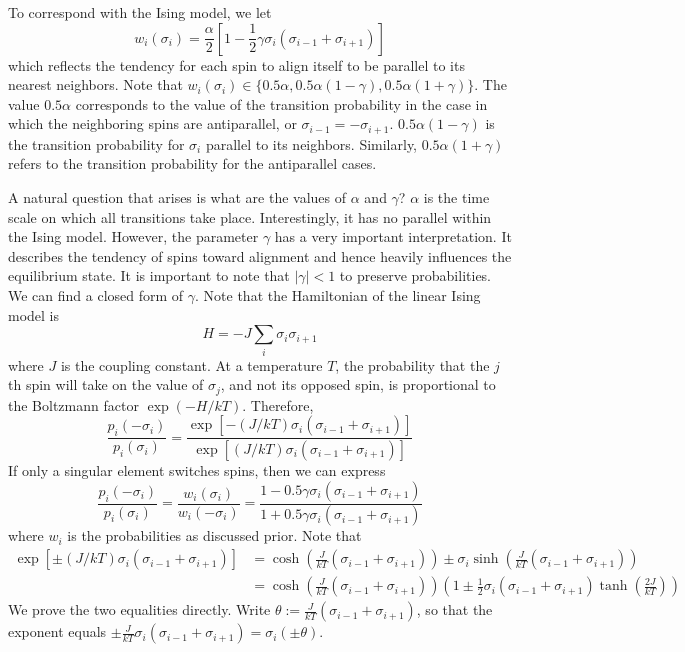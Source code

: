 \documentclass[12pt]{article}
\theoremstyle{definition}
\theoremstyle{remark}
\begin{document}
To correspond with the Ising model, we let 
\[
w_i(\sigma_i) = \frac{\alpha}{2}\left[1 - \frac{1}{2} \gamma \sigma_i (\sigma_{i-1} + \sigma_{i+1}) \right]
\]
which reflects the tendency for each spin to align itself to be parallel to its nearest neighbors. Note that $w_i(\sigma_i) \in \{0.5\alpha, 0.5\alpha(1 - \gamma), 0.5\alpha(1+\gamma)\}$. The value $0.5\alpha$ corresponds to the value of the transition probability in the case in which the neighboring spins are antiparallel, or $\sigma_{i-1} = - \sigma_{i+1}$. $0.5\alpha(1-\gamma)$ is the transition probability for $\sigma_i$ parallel to its neighbors. Similarly, $0.5\alpha(1+\gamma)$ refers to the transition probability for the antiparallel cases.

A natural question that arises is what are the values of $\alpha$ and $\gamma$? $\alpha$ is the time scale on which all transitions take place. Interestingly, it has no parallel within the Ising model. However, the parameter $\gamma$ has a very important interpretation. It describes the tendency of spins toward alignment and hence heavily influences the equilibrium state. It is important to note that $|\gamma| < 1$ to preserve probabilities. We can find a closed form of $\gamma$. Note that the Hamiltonian of the linear Ising model is 
\[
H = -J \sum_i \sigma_i \sigma_{i+1}
\]
where $J$ is the coupling constant. At a temperature $T$, the probability that the $j$th spin will take on the value of $\sigma_j$, and not its opposed spin, is proportional to the Boltzmann factor $\exp(-H/kT)$. Therefore,
\[
\frac{p_i(-\sigma_i)}{p_i(\sigma_i)} = \frac{\exp \left[ -(J/kT)\sigma_i(\sigma_{i-1} + \sigma_{i+1})\right]}{\exp \left[ (J/kT)\sigma_i(\sigma_{i-1} + \sigma_{i+1})\right]}
\]
If only a singular element switches spins, then we can express 
\[
\frac{p_i(-\sigma_i)}{p_i(\sigma_i)} = \frac{w_i(\sigma_i)}{w_i(-\sigma_i)} = \frac{1 - 0.5\gamma \sigma_i (\sigma_{i-1} + \sigma_{i+1})}{1 + 0.5\gamma \sigma_i (\sigma_{i-1} + \sigma_{i+1})}
\]
where $w_i$ is the probabilities as discussed prior. 
Note that 
\begin{align*}
    \exp\left[\pm (J/kT)\sigma_i (\sigma_{i-1} + \sigma_{i+1}) \right] &= \cosh\left(\frac{J}{kT}(\sigma_{i-1} + \sigma_{i+1})\right) \pm \sigma_i \sinh \left(\frac{J}{kT}(\sigma_{i-1} + \sigma_{i+1})\right)\\
    &= \cosh\left(\frac{J}{kT}(\sigma_{i-1} + \sigma_{i+1}) \right) \left( 1 \pm \frac{1}{2} \sigma_i (\sigma_{i-1} + \sigma_{i+1}) \tanh \left( \frac{2J}{kT} \right) \right)
\end{align*}
We prove the two equalities directly. Write $\theta := \frac{J}{kT}(\sigma_{i-1} + \sigma_{i+1})$, so that the exponent equals $\pm\frac{J}{kT}\sigma_i(\sigma_{i-1} + \sigma_{i+1}) = \sigma_i(\pm\theta)$.
\end{document}
